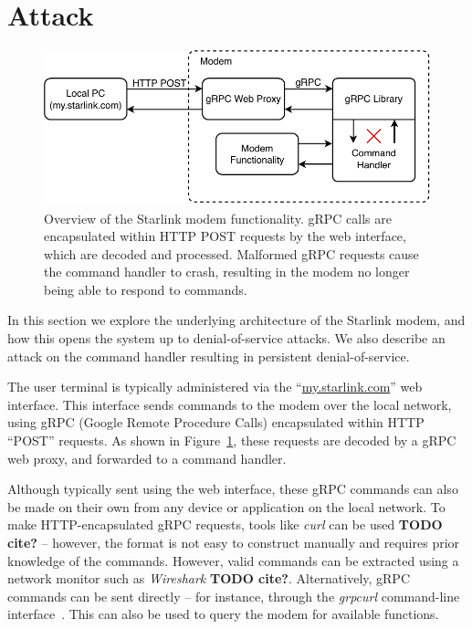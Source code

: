 \section{Attack}\label{sec:attack}

\begin{figure}
    \centering\includegraphics[width=\columnwidth]{img/modem.pdf}
    \caption{Overview of the Starlink modem functionality. gRPC calls are encapsulated within HTTP POST requests by the web interface, which are decoded and processed. Malformed gRPC requests cause the command handler to crash, resulting in the modem no longer being able to respond to commands.}
    \label{fig:modem}
\end{figure}

In this section we explore the underlying architecture of the Starlink modem, and how this opens the system up to denial-of-service attacks.
We also describe an attack on the command handler resulting in persistent denial-of-service.

The user terminal is typically administered via the ``\url{my.starlink.com}'' web interface.
This interface sends commands to the modem over the local network, using gRPC (Google Remote Procedure Calls) encapsulated within HTTP ``POST'' requests.
As shown in Figure~\ref{fig:modem}, these requests are decoded by a gRPC web proxy, and forwarded to a command handler.

Although typically sent using the web interface, these gRPC commands can also be made on their own from any device or application on the local network.
To make HTTP-encapsulated gRPC requests, tools like \textit{curl} can be used \textbf{TODO cite?} -- however, the format is not easy to construct manually and requires prior knowledge of the commands.
However, valid commands can be extracted using a network monitor such as \textit{Wireshark} \textbf{TODO cite?}.
Alternatively, gRPC commands can be sent directly -- for instance, through the \textit{grpcurl} command-line interface~\cite{gRPCurl}.
This can also be used to query the modem for available functions.

